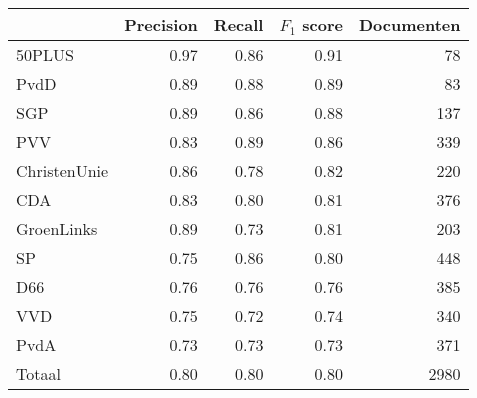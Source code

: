 \begin{tabular}{lrrrr}
\toprule
{} &  Precision &  Recall &  $F_1$ score &  Documenten \\
\midrule
50PLUS       &       0.97 &    0.86 &      0.91 &          78 \\
PvdD         &       0.89 &    0.88 &      0.89 &          83 \\
SGP          &       0.89 &    0.86 &      0.88 &         137 \\
PVV          &       0.83 &    0.89 &      0.86 &         339 \\
ChristenUnie &       0.86 &    0.78 &      0.82 &         220 \\
CDA          &       0.83 &    0.80 &      0.81 &         376 \\
GroenLinks   &       0.89 &    0.73 &      0.81 &         203 \\
SP           &       0.75 &    0.86 &      0.80 &         448 \\
D66          &       0.76 &    0.76 &      0.76 &         385 \\
VVD          &       0.75 &    0.72 &      0.74 &         340 \\
PvdA         &       0.73 &    0.73 &      0.73 &         371 \\
\midrule
Totaal       &       0.80 &    0.80 &      0.80 &        2980 \\
\bottomrule
\end{tabular}
